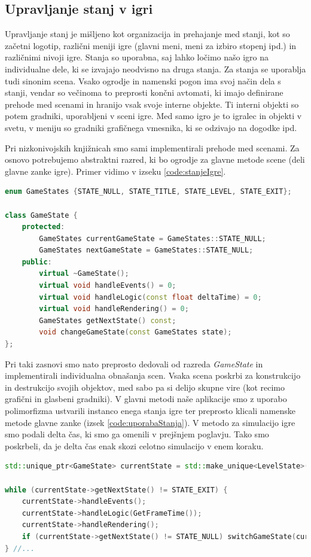 \documentclass[12pt,a4paper,twoside]{book}
\begin{document}
\subsection{Upravljanje stanj v igri}
Upravljanje stanj je mišljeno kot organizacija in prehajanje med stanji, kot so začetni logotip, različni meniji igre (glavni meni, meni za izbiro stopenj ipd.) in različnimi nivoji igre. Stanja so uporabna, saj lahko ločimo našo igro na individualne dele, ki se izvajajo neodvisno na druga stanja. Za stanja se uporablja tudi sinonim scena. Vsako ogrodje in namenski pogon ima svoj način dela s stanji, vendar so večinoma to preprosti končni avtomati, ki imajo definirane prehode med scenami in hranijo vsak svoje interne objekte. Ti interni objekti so potem gradniki, uporabljeni v sceni igre. Med samo igro je to igralec in objekti v svetu, v meniju so gradniki grafičnega vmesnika, ki se odzivajo na dogodke ipd.

Pri nizkonivojskih knjižnicah smo sami implementirali prehode med scenami. Za osnovo potrebujemo abstraktni razred, ki bo ogrodje za glavne metode scene (deli glavne zanke igre). Primer vidimo v izseku \ref{code:stanjeIgre}.

\begin{lstlisting}[label=code:stanjeIgre, language=C++, caption=Stanje igre]
enum GameStates {STATE_NULL, STATE_TITLE, STATE_LEVEL, STATE_EXIT};

class GameState {
	protected:
		GameStates currentGameState = GameStates::STATE_NULL;
		GameStates nextGameState = GameStates::STATE_NULL;
	public:
		virtual ~GameState();
		virtual void handleEvents() = 0;
		virtual void handleLogic(const float deltaTime) = 0;
		virtual void handleRendering() = 0;
		GameStates getNextState() const;
		void changeGameState(const GameStates state);
};
\end{lstlisting}

Pri taki zasnovi smo nato preprosto dedovali od razreda \textit{GameState} in implementirali individualna obnašanja scen. Vsaka scena poskrbi za konstrukcijo in destrukcijo svojih objektov, med sabo pa si delijo skupne vire (kot recimo grafični in glasbeni gradniki). V glavni metodi naše aplikacije smo z uporabo polimorfizma ustvarili instanco enega stanja igre ter preprosto klicali namenske metode glavne zanke (izsek \ref{code:uporabaStanja}). V metodo za simulacijo igre smo podali delta čas, ki smo ga omenili v prejšnjem poglavju. Tako smo poskrbeli, da je delta čas enak skozi celotno simulacijo v enem koraku.

\begin{lstlisting}[label=code:uporabaStanja, language=C++, caption=Uporaba stanja igre]
std::unique_ptr<GameState> currentState = std::make_unique<LevelState>();

while (currentState->getNextState() != STATE_EXIT) {
	currentState->handleEvents();
	currentState->handleLogic(GetFrameTime());
	currentState->handleRendering();
	if (currentState->getNextState() != STATE_NULL) switchGameState(currentState);
} //...
\end{lstlisting}
\end{document}
